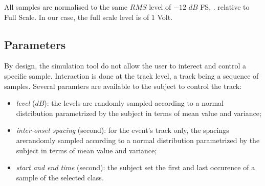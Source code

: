 \documentclass[twoside,twocolumn]{article}
\begin{document}
All samples are normalised to the same $RMS$ level of $-12$ $dB$ FS, \ie. relative to Full Scale. In our case, the full scale level is of 1 Volt.

\subsection{Parameters}
\label{sec:simscene_parametre}


By design, the simulation tool do not allow the user to interect and control a specific sample. Interaction is done at the track level, a track being a sequence of samples. Several paramters are available to the subject to control the track:


\begin{itemize}
\item \emph{level} ($dB$): the levels are  randomly sampled according to a normal distribution parametrized by the subject in terms of mean value and variance;
\item \emph{inter-onset spacing} (second): for the event's track only, the spacings arerandomly sampled according to a normal distribution parametrized by the subject in terms of mean value and variance;
\item \emph{start and end time} (second): the subject set the first and last occurence of a sample of the selected class.
\end{itemize}

\end{document}
